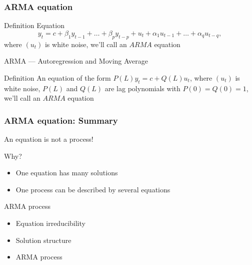 \begin{frame}
	\frametitle{ARMA equation}
	
	\begin{block}{Definition}
		Equation
		\[
		y_t = c + \beta_1 y_{t-1} + \ldots + \beta_p y_{t-p} + u_t + \alpha_1 u_{t-1} + \ldots + \alpha_q u_{t-q},
		\]
		where $(u_t)$ is white noise, we'll call an $ARMA$  equation
		
	\end{block}

	\alert{ARMA — Autoregression and Moving Average}	
	
	\pause
	\begin{block}{Definition}
		An equation of the form $P(L) y_t = c + Q(L) u_t$,
		where $(u_t)$ is white noise, $P(L)$ and $Q(L)$ are lag polynomials with $P(0)=Q(0)=1$, we'll call  an $ARMA$ equation
	\end{block}
	
\end{frame}

\begin{frame}
	\frametitle{ARMA equation: Summary}
	
	
	An equation is not a process! \pause 
	
	Why?
	

	\begin{itemize}[<+->]
		\item One equation has \alert{many solutions}
		\item One process can be described by \alert{several equations}
	\end{itemize}
	
\end{frame}



\begin{frame} %
	
	
\end{frame}



\begin{frame}{ARMA process}
	\begin{itemize}[<+->]
		\item Equation irreducibility
		\item Solution structure
		\item ARMA process
	\end{itemize}
	
\end{frame}



